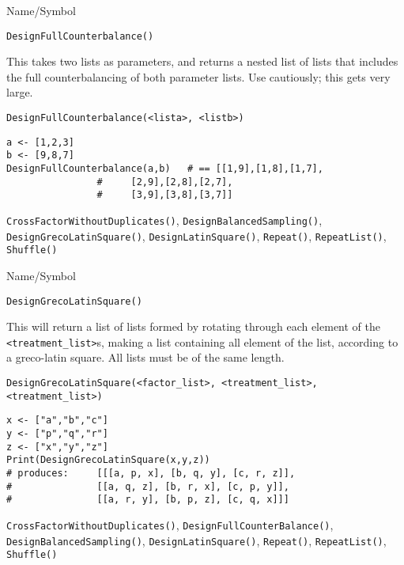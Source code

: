 \rl




\begin{desc}{Name/Symbol}

\item[Name/Symbol]	\verb+DesignFullCounterbalance()+

\item[Description]	This takes two lists as parameters, and returns a nested list 
		of lists that includes the full counterbalancing of both 
		parameter lists.  Use cautiously; this gets very large.

\item[Usage]
\begin{verbatim}
DesignFullCounterbalance(<lista>, <listb>)
\end{verbatim}

\item[Example]
\begin{verbatim}
a <- [1,2,3]
b <- [9,8,7]
DesignFullCounterbalance(a,b)	# == [[1,9],[1,8],[1,7],
				#     [2,9],[2,8],[2,7],
				#     [3,9],[3,8],[3,7]]
\end{verbatim}

\item[See Also] \verb+CrossFactorWithoutDuplicates()+,
  \verb+DesignBalancedSampling()+, \verb+DesignGrecoLatinSquare()+,
  \verb+DesignLatinSquare()+, \verb+Repeat()+, \verb+RepeatList()+,
  \verb+Shuffle()+
\end{desc}

\rl




\begin{desc}{Name/Symbol}
\item[Name/Symbol]	\verb+DesignGrecoLatinSquare()+

\item[Description] This will return a list of lists formed by rotating
  through each element of the \verb+<treatment_list>+s, making a list
  containing all element of the list, according to a greco-latin
  square.  All lists must be of the same length.

\item[Usage]
\begin{verbatim}
DesignGrecoLatinSquare(<factor_list>, <treatment_list>, 
<treatment_list>)
\end{verbatim}

\item[Example]
\begin{verbatim}
x <- ["a","b","c"]
y <- ["p","q","r"]
z <- ["x","y","z"]
Print(DesignGrecoLatinSquare(x,y,z))
# produces:   	[[[a, p, x], [b, q, y], [c, r, z]], 
#               [[a, q, z], [b, r, x], [c, p, y]], 
#               [[a, r, y], [b, p, z], [c, q, x]]]
\end{verbatim}

\item[See Also] \verb+CrossFactorWithoutDuplicates()+,
  \verb+DesignFullCounterBalance()+, \verb+DesignBalancedSampling()+,
  \verb+DesignLatinSquare()+, \verb+Repeat()+, \verb+RepeatList()+,
  \verb+Shuffle()+
\end{desc}

